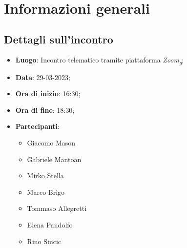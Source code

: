 \section{Informazioni generali}

\subsection{Dettagli sull'incontro}
\begin{itemize}
\item \textbf{Luogo}: Incontro telematico tramite piattaforma \textit{Zoom\textsubscript{g}};
\item \textbf{Data}: 29-03-2023;
\item \textbf{Ora di inizio}: 16:30;
\item \textbf{Ora di fine}: 18:30;
\item \textbf{Partecipanti}: 
\begin{itemize}
	\item Giacomo Mason
	\item Gabriele Mantoan
	\item Mirko Stella
	\item Marco Brigo
	\item Tommaso Allegretti
	\item Elena Pandolfo
	\item Rino Sincic
\end{itemize}
\end{itemize}